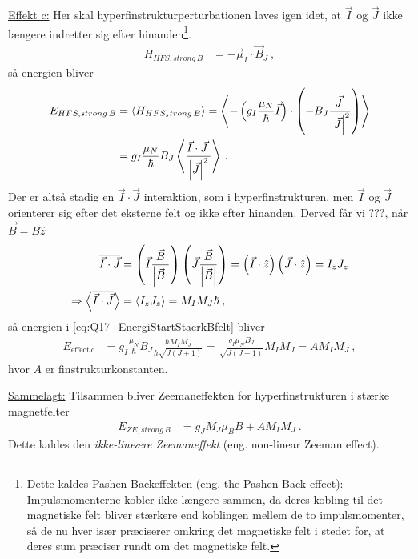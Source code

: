 \noindent\underline{Effekt c:} Her skal hyperfinstrukturperturbationen laves igen idet, at $\Vec{I}$ og $\Vec{J}$ ikke længere indretter sig efter hinanden\footnote{Dette kaldes Pashen-Backeffekten (eng. the Pashen-Back effect): Impulsmomenterne kobler ikke længere sammen, da deres kobling til det magnetiske felt bliver stærkere end koblingen mellem de to impulsmomenter, så de nu hver især præciserer omkring det magnetiske felt i stedet for, at deres sum præciser rundt om det magnetiske felt.}.
\begin{align}
    H_{HFS,strong\,B} &= - \Vec{\mu}_I \cdot \Vec{B}_J \: ,
\end{align}
så energien bliver
\begin{align} \label{eq:Q17_EnergiStartStaerkBfelt}
    E_{HFS,strong\,B} &= \Braket{H_{HFS_strong\,B}} = \Braket{- \left(g_I \frac{\mu_N}{\hbar}\Vec{I}\right) \cdot \left(- B_J\frac{\Vec{J} \:}{\abs{\Vec{J}}^2}\right)} \nonumber\\
    &= g_I \frac{\mu_N}{\hbar}B_J \Braket{\frac{\Vec{I} \cdot \Vec{J} \:}{\abs{\Vec{J}}^2}} \: .
\end{align}
Der er altså stadig en $\Vec{I} \cdot \Vec{J}$ interaktion, som i hyperfinstrukturen, men $\Vec{I}$ og $\Vec{J}$ orienterer sig efter det eksterne felt og ikke efter hinanden. Derved får vi ???, når $\Vec{B} = B \hat{z}$
\begin{align}
    \overline{\Vec{I} \cdot \Vec{J}} &= \left(\Vec{I}\frac{\Vec{B}}{\abs{\Vec{B}}}\right)\left(\Vec{J}\frac{\Vec{B}}{\abs{\Vec{B}}}\right) = \left(\Vec{I} \cdot \hat{z}\right)\left(\Vec{J} \cdot \hat{z}\right) = I_z J_z \\
    \Rightarrow \Braket{\overline{\Vec{I} \cdot \Vec{J}}} &= \Braket{I_z J_z} = M_I M_J \hbar \: ,
\end{align}
så energien i \cref{eq:Q17_EnergiStartStaerkBfelt} bliver
\begin{align} \label{eq:Q17_EnergyFromEffectC}
    E_{\text{effect}\,c} &= g_I \frac{\mu_N}{\hbar}B_J \frac{\hbar M_I M_J}{\hbar \sqrt{J(J+1)}} = \frac{g_I \mu_N B_J}{\sqrt{J(J+1)}} M_I M_J = A M_I M_J \: ,
\end{align}
hvor $A$ er finstrukturkonstanten.

\noindent\underline{Sammelagt:} Tilsammen bliver Zeemaneffekten for hyperfinstrukturen i stærke magnetfelter
\begin{align} \label{eq:EnergiskiftZeemanIHyperfinstrukturStarktFelt}
    E_{ZE,strong\,B} &= g_J M_J \mu_B B + A M_I M_J \: .
\end{align}
Dette kaldes den \emph{ikke-lineære Zeemaneffekt} (eng. non-linear Zeeman effect).


